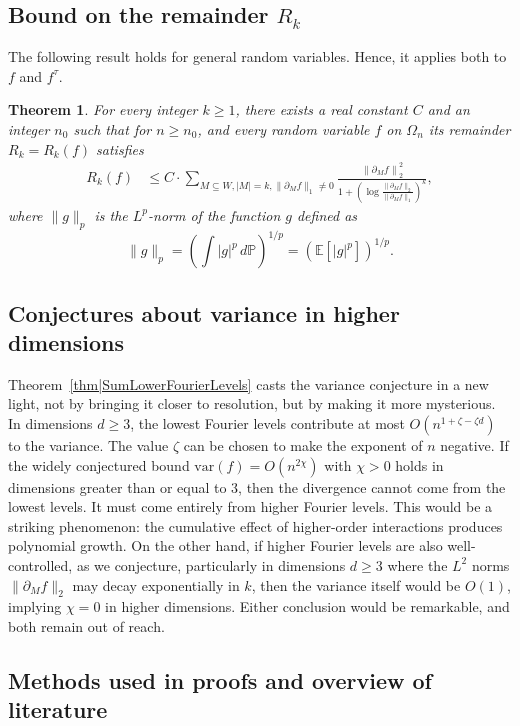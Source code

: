 \documentclass[reqno]{amsart}
\newtheorem{theorem}{Theorem}
\begin{document}
\subsection{Bound on the remainder $R_k$} \label{subsec|BRemainder}
 The following result holds for general random variables. Hence, it applies both to $f$ and $f^{\tau}$.
\begin{theorem}\label{thm|BoundRemainder}
 For every integer $k\geq 1$, there exists a real constant $C$ and an integer $n_0$ such that 
for $n\geq n_0$, and every random variable $f$ on $\Omega_n$ its remainder $R_k=R_k(f)$ satisfies
\begin{align}
R_k(f)&\leq 
C\cdot \sum_{M\subseteq W, |M|=k, \|\partial_Mf\|_1\neq 0}\frac{ \left\|\partial_Mf\right\|_2^2}{
1+\left(\log\frac{\|\partial_Mf\|_2}{\|\partial_Mf\|_1}\right)^k
},
\label{eqn|BoundRemainder}
\end{align} 
where $\|g\|_p$ is the $L^p$-norm of the function $g$ defined as \[\|g\|_p=\left(\int |g|^p\,d\mathbb P\right)^{1/p}=\left(\mathbb E[|g|^p]\right)^{1/p}.\]
\end{theorem}

\subsection{Conjectures about variance in higher dimensions}
Theorem~\ref{thm|SumLowerFourierLevels} casts the variance 
conjecture in a new light, not by bringing it closer to resolution, 
but by making it more mysterious. In dimensions $d\geq 3$, the lowest Fourier levels contribute at most $O( n^{1+\zeta-\zeta d}) $ to the variance. The value $\zeta$ can be chosen to make the exponent of $n$ negative. If the 
widely conjectured bound $\mathrm{var}(f)=O(n^{2\chi})$ with 
$\chi>0$ holds in dimensions greater than or equal to $3$, then the divergence cannot come from the lowest levels. It must come entirely from higher Fourier 
levels. This would be a striking phenomenon: the cumulative effect of higher-order interactions produces 
polynomial growth. On the other hand, if higher Fourier levels are 
also well-controlled, as we conjecture, particularly in dimensions 
$d\geq 3$ where the $L^2$ norms $\|\partial_M f\|_2$ may decay 
exponentially in $k$, then the variance itself would be $O(1)$, 
implying $\chi=0$ in higher dimensions. Either conclusion would be 
remarkable, and both remain out of reach.

\subsection{Methods used in proofs and overview of literature}
\end{document}

